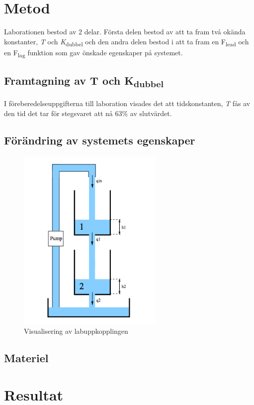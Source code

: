 \documentclass{article}
\begin{document}
\section{Metod}
Laborationen bestod av 2 delar. Första delen bestod av att ta fram två okända konstanter, {\itshape T} och {\itshape K}\textsubscript{dubbel} och den andra delen bestod i att ta fram en F\textsubscript{lead} och en F\textsubscript{lag} funktion som gav önskade egenskaper på systemet.

\subsection{Framtagning av T och K\textsubscript{dubbel}}
I föreberedelseuppgifterna till laboration visades det att tidskonstanten, {\itshape T} fås av den tid det tar för stegsvaret att nå 63\% av slutvärdet. 

\subsection{Förändring av systemets egenskaper}


\begin{figure}[ht!]
\centering
\includegraphics[width=70mm]{System.png}
\caption{Visualisering av labuppkopplingen}
\label{overflow}
\end{figure}

\subsection{Materiel}

\section{Resultat}
\end{document}
